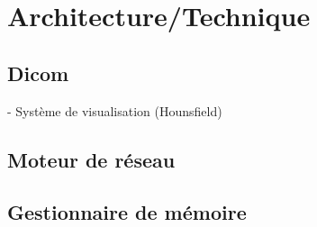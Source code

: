 \chapter{Architecture/Technique}


\section{Dicom}

- Système de visualisation (Hounsfield)

\section{Moteur de réseau}

\section{Gestionnaire de mémoire}
